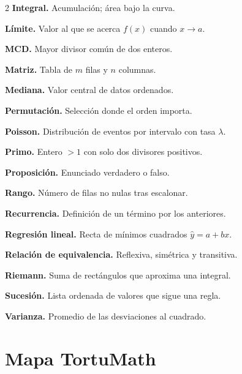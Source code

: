 \begin{multicols}{2}
\textbf{Integral.} Acumulaci\'on; \'area bajo la curva.

\textbf{L\'imite.} Valor al que se acerca $f(x)$ cuando $x\to a$.

\textbf{MCD.} Mayor divisor com\'un de dos enteros.

\textbf{Matriz.} Tabla de $m$ filas y $n$ columnas.

\textbf{Mediana.} Valor central de datos ordenados.

\textbf{Permutaci\'on.} Selecci\'on donde el orden importa.

\textbf{Poisson.} Distribuci\'on de eventos por intervalo con tasa $\lambda$.

\textbf{Primo.} Entero $>1$ con solo dos divisores positivos.

\textbf{Proposici\'on.} Enunciado verdadero o falso.

\textbf{Rango.} N\'umero de filas no nulas tras escalonar.

\textbf{Recurrencia.} Definici\'on de un t\'ermino por los anteriores.

\textbf{Regresi\'on lineal.} Recta de m\'inimos cuadrados $\hat y=a+bx$.

\textbf{Relaci\'on de equivalencia.} Reflexiva, sim\'etrica y transitiva.

\textbf{Riemann.} Suma de rect\'angulos que aproxima una integral.

\textbf{Sucesi\'on.} Lista ordenada de valores que sigue una regla.

\textbf{Varianza.} Promedio de las desviaciones al cuadrado.
\end{multicols}

\chapter{Mapa TortuMath}

